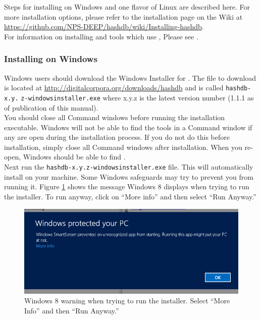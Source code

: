\documentclass[11pt,fleqn]{article} %
\begin{document}
Steps for installing \hdb on Windows and one flavor of Linux are described here. For more installation options, please refer to the installation page on the \hdb Wiki at \url{https://github.com/NPS-DEEP/hashdb/wiki/Installing-hashdb}.\\

For information on installing \sscope and \bulk tools which use \hdb, Please see \textbf{}.\\

\subsubsection{Installing on Windows}
Windows users should download the Windows Installer for \hdb. The file to download is located at \url{http://digitalcorpora.org/downloads/hashdb} and is called \texttt{hashdb-x.y.} \texttt{z-windowsinstaller.exe} where x.y.z is the latest version number (1.1.1 as of publication of this manual).\\

You should close all Command windows before running the installation executable. Windows will not be able to find the \hdb tools in a Command window if any are open during the installation process. If you do not do this before installation, simply close all Command windows after installation. When you re-open, Windows should be able to find \hdb.\\

 Next run the \texttt{hashdb-x.y.z-windowsinstaller.exe} file. This will automatically install \hdb on your machine. Some Windows safeguards may try to prevent you from running it. Figure \ref{fig:windowsWarning} shows the message Windows 8 displays when trying to run the installer. To run anyway, click on ``More info'' and then select ``Run Anyway.'' \\
\begin{figure}
	\center
	\includegraphics[scale=.5]{windowsWarning.png}
	\caption{Windows 8 warning when trying to run the installer. Select ``More Info'' and then ``Run Anyway.''}
	\label{fig:windowsWarning}
\end{figure}
\end{document}
